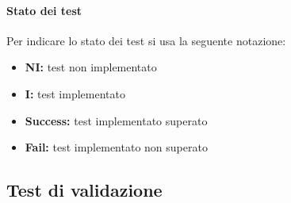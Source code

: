 \documentclass[12pt,a4paper]{article}
\begin{document}
	\paragraph{Stato dei test}
	Per indicare lo stato dei test si usa la seguente notazione:

	\begin{itemize}
		\item \textbf{NI:} test non implementato
		\item \textbf{I:} test implementato
		\item \textbf{Success:} test implementato superato
		\item \textbf{Fail:} test implementato non superato
	\end{itemize}
		
\subsection{Test di validazione}\label{test_pianificazione}	
\end{document}
